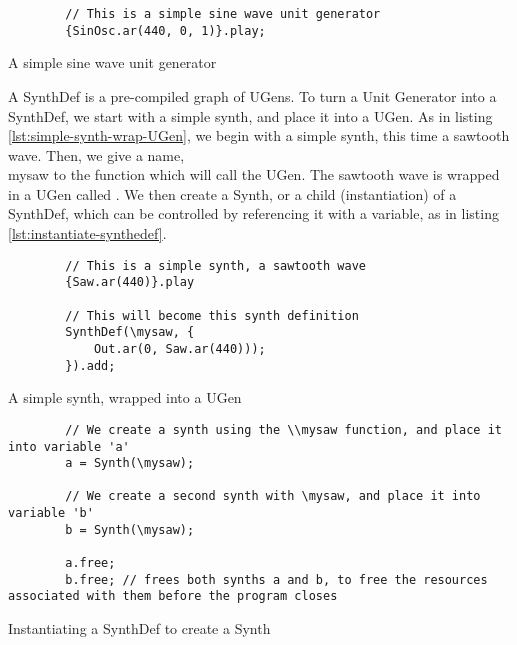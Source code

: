 \begin{listing}
	\begin{lstlisting}
		// This is a simple sine wave unit generator
		{SinOsc.ar(440, 0, 1)}.play;
	\end{lstlisting}
	\caption{A simple sine wave unit generator}
	\label{lst:sine-wave-ug}
\end{listing}

A SynthDef is a pre-compiled graph of UGens. To turn a Unit Generator into a SynthDef, we start with a simple synth, and place it into a UGen. As in listing \ref{lst:simple-synth-wrap-UGen}, we begin with a simple synth, this time a sawtooth wave. Then, we give a name, \\mysaw to the function which will call the UGen. The sawtooth wave is wrapped in a UGen called . We then create a Synth, or a child (instantiation) of a SynthDef, which can be controlled by referencing it with a variable, as in listing \ref{lst:instantiate-synthedef}\cite{McCartney_2021}.

\begin{listing}
	\begin{lstlisting}
		// This is a simple synth, a sawtooth wave
		{Saw.ar(440)}.play
		
		// This will become this synth definition
		SynthDef(\mysaw, {
			Out.ar(0, Saw.ar(440)));
		}).add;
	\end{lstlisting}
	\caption{A simple synth, wrapped into a UGen}
	\label{lst:simple-synth-wrap-UGen}
\end{listing}

\begin{listing}
	\begin{lstlisting}
		// We create a synth using the \\mysaw function, and place it into variable 'a'
		a = Synth(\mysaw);
		
		// We create a second synth with \mysaw, and place it into variable 'b'
		b = Synth(\mysaw);
		
		a.free;
		b.free; // frees both synths a and b, to free the resources associated with them before the program closes
	\end{lstlisting}
	\caption{Instantiating a SynthDef to create a Synth}
	\label{lst:instantiate-synthedef}
\end{listing}


